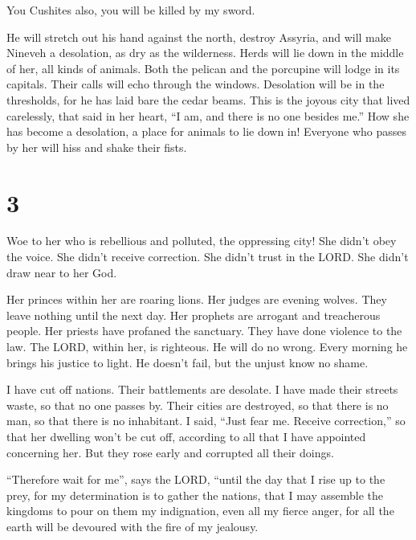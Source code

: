  You Cushites also, you will be killed by my sword.

 He will stretch out his hand against the north, destroy
Assyria, and will make Nineveh a desolation, as dry as the wilderness.
 Herds will lie down in the middle of her, all kinds of
animals. Both the pelican and the porcupine will lodge in its capitals.
Their calls will echo through the windows. Desolation will be in the
thresholds, for he has laid bare the cedar beams.  This is
the joyous city that lived carelessly, that said in her heart, ``I am,
and there is no one besides me.'' How she has become a desolation, a
place for animals to lie down in! Everyone who passes by her will hiss
and shake their fists.

\hypertarget{section-2}{%
\section{3}\label{section-2}}

 Woe to her who is rebellious and polluted, the oppressing
city!  She didn't obey the voice. She didn't receive
correction. She didn't trust in the LORD. She didn't draw near to her
God.

 Her princes within her are roaring lions. Her judges are
evening wolves. They leave nothing until the next day.  Her
prophets are arrogant and treacherous people. Her priests have profaned
the sanctuary. They have done violence to the law.  The
LORD, within her, is righteous. He will do no wrong. Every morning he
brings his justice to light. He doesn't fail, but the unjust know no
shame.

 I have cut off nations. Their battlements are desolate. I
have made their streets waste, so that no one passes by. Their cities
are destroyed, so that there is no man, so that there is no inhabitant.
 I said, ``Just fear me. Receive correction,'' so that her
dwelling won't be cut off, according to all that I have appointed
concerning her. But they rose early and corrupted all their doings.

 ``Therefore wait for me'', says the LORD, ``until the day
that I rise up to the prey, for my determination is to gather the
nations, that I may assemble the kingdoms to pour on them my
indignation, even all my fierce anger, for all the earth will be
devoured with the fire of my jealousy.

